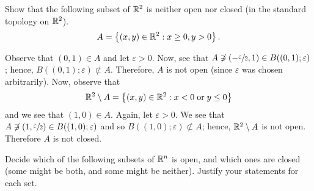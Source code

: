 \documentclass[a4paper, answers]{exam}
\begin{document}
\begin{questions}
	\pagebreak
	\question
		Show that the following subset of $\mathbb{R}^2$ is neither open nor closed
		(in the standard topology on $\mathbb{R}^2$).
		\[
			A = \left\{
				(x,y) \in \mathbb{R}^2 : x \geq 0, y > 0
			\right\}.
		\]
		
		\begin{solution}
			Observe that $(0,1) \in A$ and let $\varepsilon > 0$.
			Now, see that 
			$A \not\ni (-\sfrac{\varepsilon}2, 1) \in B((0,1);\varepsilon)$; 
			hence, $B((0,1); \varepsilon) \not\subset A$.
			Therefore, $A$ is not open (since $\varepsilon$ was chosen 
			arbitrarily).
			Now, observe that
			\[
				\mathbb{R}^2 \setminus A = \left\{ 
					(x,y) \in \mathbb{R}^2: x < 0 \;\text{or}\;y \leq 0 
				\right\}
			\]
			and we see that $(1,0) \in A$. 
			Again, let $\varepsilon > 0$.
			We see that 
			$A \not\ni (1, \sfrac{\varepsilon}2) \in B((1,0); \varepsilon)$
			and so $B((1,0); \varepsilon) \not\subset A$;
			hence, $\mathbb{R}^2 \setminus A$ is not open.
			Therefore $A$ is not closed.
		\end{solution}

	\pagebreak
	\question
		Decide which of the following subsets of $\mathbb{R}^n$ is open, and which
		ones are closed (some might be both, and some might be neither).
		Justify your statements for each set.
\end{questions}
\end{document}
